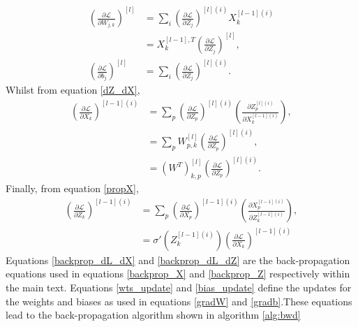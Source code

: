 \documentclass[11pt,twocolumn]{article}
\begin{document}
\begin{align}
\left(\frac{\partial \mathcal{L}}{\partial W_{j,k}}\right)^{[l]}&=\sum_{i}\left(\frac{\partial \mathcal{L}}{\partial Z_{j}}\right)^{[l](i)}X_{k}^{[l-1](i)}\\
&=X_{k}^{[l-1],T}\left(\frac{\partial \mathcal{L}}{\partial Z_{j}}\right)^{[l]},\label{wts_update}\\
\left(\frac{\partial \mathcal{L}}{\partial b_{j}}\right)^{[l]}&=\sum_{i}\left(\frac{\partial \mathcal{L}}{\partial Z_{j}}\right)^{[l](i)}\label{bias_update}.
\end{align}
Whilst from equation \ref{dZ_dX},
\begin{align}
\left(\frac{\partial \mathcal{L}}{\partial X_{k}}\right)^{[l-1](i)}&=\sum_{p}\left(\frac{\partial \mathcal{L}}{\partial Z_{p}}\right)^{[l](i)}\left(\frac{\partial Z_{p}^{[l](i)}}{\partial X_{k}^{[l-1](i)}}\right),\\
&=\sum_{p} W_{p,k}^{[l]}\left(\frac{\partial \mathcal{L}}{\partial Z_{p}}\right)^{[l](i)},\\
&=\left(W^{T}\right)_{k,p}^{[l]}\left(\frac{\partial \mathcal{L}}{\partial Z_{p}}
\right)^{[l](i)}\label{backprop_dL_dX}.
\end{align}
Finally, from equation \ref{propX},
\begin{align}
\left(\frac{\partial \mathcal{L}}{\partial Z_{k}}\right)^{[l-1](i)}&=\sum_{p}\left(\frac{\partial \mathcal{L}}{\partial X_{p}}\right)^{[l-1](i)}\left(\frac{\partial X_{p}^{[l-1](i)}}{\partial Z_{k}^{[l-1](i)}}\right),\\
&= \sigma'{(Z_{k}^{[l-1](i)})}\left(\frac{\partial \mathcal{L}}{\partial X_{k}}\right)^{[l-1](i)}\label{backprop_dL_dZ}
\end{align}
Equations \ref{backprop_dL_dX} and \ref{backprop_dL_dZ} are the back-propagation equations used in equations \ref{backprop_X} and \ref{backprop_Z} respectively within the main text. Equations \ref{wts_update} and \ref{bias_update} define the updates for the weights and biases as used in equations \ref{gradW} and \ref{gradb}.These equations lead to the back-propagation algorithm shown in algorithm \ref{alg:bwd} 

\onecolumn
\end{document}
